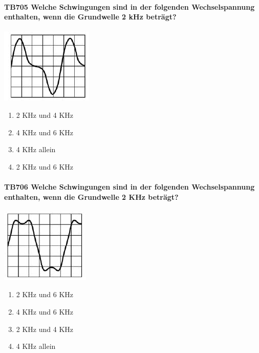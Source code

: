 \documentclass[8pt]{article}
\begin{document}
\begin{enumerate}
\paragraph*{TB705 Welche Schwingungen sind in der folgenden Wechselspannung enthalten, wenn die Grundwelle 2 kHz beträgt?}
\begin{center}
	\begin{minipage}{\linewidth}
		\centering
		\includegraphics[scale=1.0]{pics/tb705_a.jpg}
	\end{minipage}
\end{center}
\begin{enumerate}[nolistsep,label=\Alph*]
\item 2 KHz und 4 KHz
\item 4 KHz und 6 KHz
\item 4 KHz allein
\item 2 KHz und 6 KHz
\end{enumerate}

\paragraph*{TB706 Welche Schwingungen sind in der folgenden Wechselspannung enthalten, wenn die Grundwelle 2 KHz beträgt?}
\begin{center}
	\begin{minipage}{\linewidth}
		\centering
		\includegraphics[scale=1.0]{pics/tb706_a.jpg}
	\end{minipage}
\end{center}
\begin{enumerate}[nolistsep,label=\Alph*]
\item 2 KHz und 6 KHz
\item 4 KHz und 6 KHz
\item 2 KHz und 4 KHz
\item 4 KHz allein
\end{enumerate}


\end{enumerate}
\end{document}
